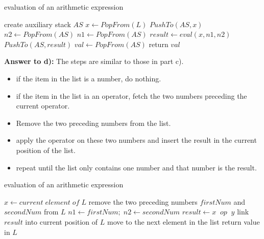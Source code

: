 \documentclass[a4paper,11pt]{article}
\theoremstyle{mytheor}
\begin{document}
\begin{algorithm}[H]
\caption{evaluation of an arithmetic expression}\label{sec:TREEEVALUATION_2_6_C}
\begin{algorithmic}[1]
  \State create auxiliary stack $AS$
    \State $x \gets PopFrom(L)$
      \State $PushTo(AS, x)$ 
    \Else
      \State $n2 \gets PopFrom(AS)$
      \State $n1 \gets PopFrom(AS)$
      \State $result \gets eval(x, n1, n2)$
      \State $PushTo(AS, result)$
    \EndIf
  \EndWhile
  \State $val \gets PopFrom(AS)$
  \State return $val$
\EndFunction
\end{algorithmic}
\end{algorithm}

\vspace{1.2in}

\noindent\textbf{Answer to d):} The steps are similar to those in part c). 
\begin{itemize}
    \item if the item in the list is a number, do nothing.
    \item if the item in the list ia an operator, fetch the two numbers preceding the current operator. \item Remove the two preceding numbers from the list. \item apply the operator on these two numbers and insert the result in the current position of the list. \item repeat until the list only contains one number and that number is the result.
\end{itemize}

\begin{algorithm}[H]
\caption{evaluation of an arithmetic expression}\label{sec:TREEEVALUATION_2_6_D}
\begin{algorithmic}[1]
    \State $x \gets current\;element\;of\; L$
      \State remove the two preceding numbers $firstNum$ and $secondNum$ from $L$
      \State $n1 \gets firstNum;\;n2 \gets secondNum$
      \State $result \gets x\;\; op\;\; y$ 
      \State link $result$ into current position of $L$
    \EndIf
    \State move to the next element in the list
  \EndWhile
  \State return value in $L$
\EndFunction
\end{algorithmic}
\end{algorithm}
\end{document}

